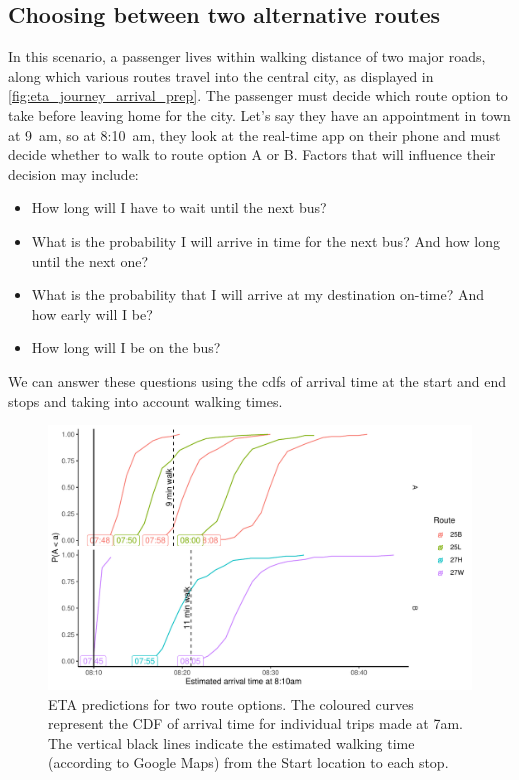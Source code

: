 \subsection{Choosing between two alternative routes}
\label{sec:journey_simple}



In this scenario, a passenger lives within walking distance of two major roads, along which various routes travel into the central city, as displayed in \cref{fig:eta_journey_arrival_prep}. The passenger must decide which route option to take before leaving home for the city. Let's say they have an appointment in town at 9~am, so at 8:10~am, they look at the real-time app on their phone and must decide whether to walk to route option A or B. Factors that will influence their decision may include:
\begin{itemize}
\item How long will I have to wait until the next bus?
\item What is the probability I will arrive in time for the next bus? And how long until the next one?
\item What is the probability that I will arrive at my destination on-time? And how early will I be?
\item How long will I be on the bus?
\end{itemize}
We can answer these questions using the \glspl{cdf} of arrival time at the start and end stops and taking into account walking times.


\begin{knitrout}\small
{}\color{fgcolor}\begin{figure}

{\centering \includegraphics[width=\textwidth]{figure/eta_journey_arrival-1} 

}

\caption[ETA predictions for two route options]{ETA predictions for two route options. The coloured curves represent the CDF of arrival time for individual trips made at 7am. The vertical black lines indicate the estimated walking time (according to Google Maps) from the Start location to each stop.}\label{fig:eta_journey_arrival}
\end{figure}


\end{knitrout}


